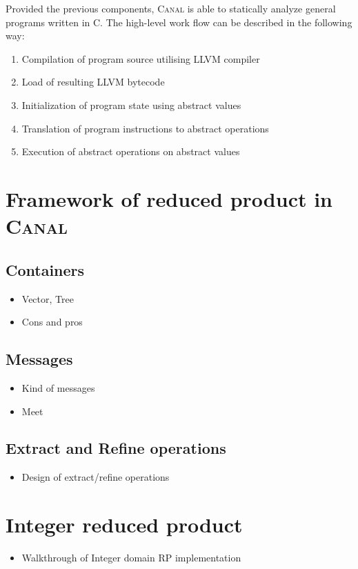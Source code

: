 \documentclass[12pt,oneside]{fithesis2}
\theoremstyle{definition}
\begin{document}
Provided the previous components, \textsc{Canal} is able to statically analyze general programs written in C. The high-level work flow can be described in the following way:

\begin{enumerate}
  \item Compilation of program source utilising LLVM compiler
  \item Load of resulting LLVM bytecode
  \item Initialization of program state using abstract values
  \item Translation of program instructions to abstract operations
  \item Execution of abstract operations on abstract values
\end{enumerate}

\section{Framework of reduced product in \textsc{Canal}}

\subsection{Containers}
\begin{itemize}
  \item Vector, Tree
  \item Cons and pros
\end{itemize}

\subsection{Messages}
\begin{itemize}
  \item Kind of messages
  \item Meet
\end{itemize}

\subsection{Extract and Refine operations}
\begin{itemize}
  \item Design of extract/refine operations
\end{itemize}

\section{Integer reduced product}
\begin{itemize}
  \item Walkthrough of Integer domain RP implementation
\end{itemize}
\end{document}
